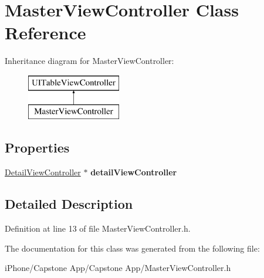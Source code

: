 \hypertarget{interface_master_view_controller}{\section{Master\-View\-Controller Class Reference}
\label{interface_master_view_controller}
}
Inheritance diagram for Master\-View\-Controller\-:\begin{figure}[H]
\begin{center}
\leavevmode
\includegraphics[height=2.000000cm]{interface_master_view_controller}
\end{center}
\end{figure}
\subsection*{Properties}
\begin{DoxyCompactItemize}
\item 
\hypertarget{interface_master_view_controller_a31bb613fe354a48864c37fc0798772df}{\hyperlink{interface_detail_view_controller}{Detail\-View\-Controller} $\ast$ {\bfseries detail\-View\-Controller}}\label{interface_master_view_controller_a31bb613fe354a48864c37fc0798772df}

\end{DoxyCompactItemize}


\subsection{Detailed Description}


Definition at line 13 of file Master\-View\-Controller.\-h.



The documentation for this class was generated from the following file\-:\begin{DoxyCompactItemize}
\item 
i\-Phone/\-Capstone App/\-Capstone App/Master\-View\-Controller.\-h\end{DoxyCompactItemize}
